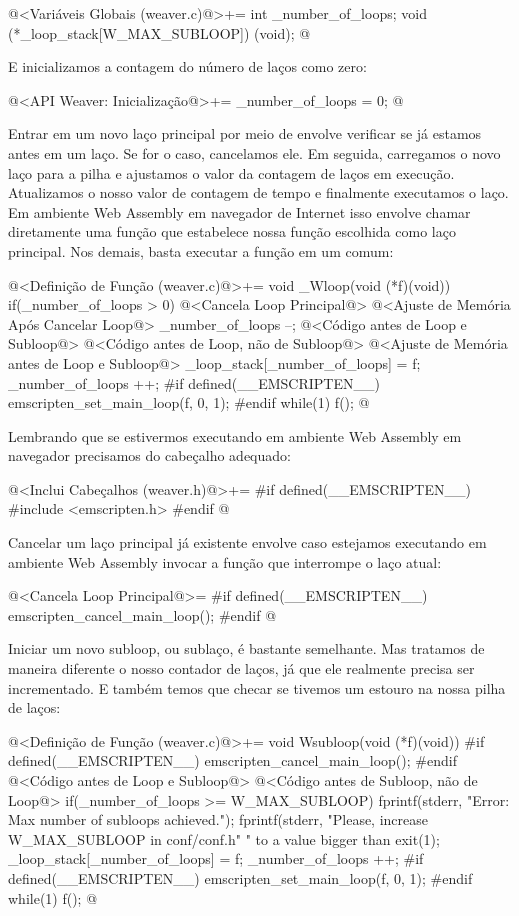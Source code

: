 \iniciocodigo
@<Variáveis Globais (weaver.c)@>+=
int _number_of_loops;
void (*_loop_stack[W_MAX_SUBLOOP]) (void);
@
\fimcodigo


E inicializamos a contagem do número de laços como zero:

\iniciocodigo
@<API Weaver: Inicialização@>+=
_number_of_loops = 0;
@
\fimcodigo

Entrar em um novo laço principal por meio de 
envolve verificar se já estamos antes em um laço. Se for o caso,
cancelamos ele. Em seguida, carregamos o novo laço para a pilha e
ajustamos o valor da contagem de laços em execução. Atualizamos o
nosso valor de contagem de tempo e finalmente executamos o laço. Em
ambiente Web Assembly em navegador de Internet isso envolve chamar
diretamente uma função que estabelece nossa função escolhida como laço
principal. Nos demais, basta executar a função em
um  comum:

\iniciocodigo
@<Definição de Função (weaver.c)@>+=
void _Wloop(void (*f)(void)){
  if(_number_of_loops > 0){
    @<Cancela Loop Principal@>
    @<Ajuste de Memória Após Cancelar Loop@>
    _number_of_loops --;
  }
  @<Código antes de Loop e Subloop@>
  @<Código antes de Loop, não de Subloop@>
  @<Ajuste de Memória antes de Loop e Subloop@>
  _loop_stack[_number_of_loops] = f;
  _number_of_loops ++;
#if defined(__EMSCRIPTEN__)
  emscripten_set_main_loop(f, 0, 1);
#endif
  while(1)
    f();
}
@
\fimcodigo

Lembrando que se estivermos executando em ambiente Web Assembly em
navegador precisamos do cabeçalho adequado:

\iniciocodigo
@<Inclui Cabeçalhos (weaver.h)@>+=
#if defined(__EMSCRIPTEN__)
#include <emscripten.h>
#endif
@
\fimcodigo

Cancelar um laço principal já existente envolve caso estejamos
executando em ambiente Web Assembly invocar a função que interrompe o
laço atual:

\iniciocodigo
@<Cancela Loop Principal@>=
#if defined(__EMSCRIPTEN__)
emscripten_cancel_main_loop();
#endif
@
\fimcodigo

Iniciar um novo subloop, ou sublaço, é bastante semelhante. Mas
tratamos de maneira diferente o nosso contador de laços, já que ele
realmente precisa ser incrementado. E também temos que checar se
tivemos um estouro na nossa pilha de laços:

\iniciocodigo
@<Definição de Função (weaver.c)@>+=
void Wsubloop(void (*f)(void)){
#if defined(__EMSCRIPTEN__)
    emscripten_cancel_main_loop();
#endif
  @<Código antes de Loop e Subloop@>
  @<Código antes de Subloop, não de Loop@>
  if(_number_of_loops >= W_MAX_SUBLOOP){
    fprintf(stderr, "Error: Max number of subloops achieved.\n");
    fprintf(stderr, "Please, increase W_MAX_SUBLOOP in conf/conf.h"
            " to a value bigger than %
    exit(1);
  }
  _loop_stack[_number_of_loops] = f;
  _number_of_loops ++;
#if defined(__EMSCRIPTEN__)
  emscripten_set_main_loop(f, 0, 1);
#endif
  while(1)
    f();
}
@
\fimcodigo

